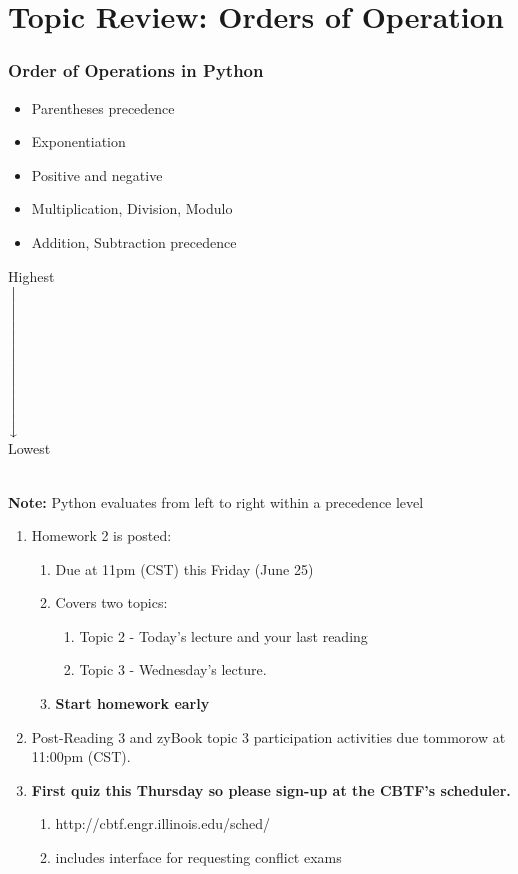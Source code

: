 \documentclass{beamer}
\newcommand{\xdownarrow}[1]{%
  {\left\downarrow\vbox to #1{}\right.\kern-\nulldelimiterspace}
}
\begin{document}
\section{Topic Review: Orders of Operation}

\begin{frame}
  \frametitle{Order of Operations in Python}
  \centering
  \begin{minipage}{0.49\textwidth}
    \begin{itemize}
      \item Parentheses precedence
      \item Exponentiation
      \item Positive and negative
      \item Multiplication, Division, Modulo
      \item Addition, Subtraction precedence
    \end{itemize}
  \end{minipage}
  \begin{minipage}{0.2\textwidth}
    \centering
    Highest\\
    $\xdownarrow{2cm}$\\
    Lowest\\
  \end{minipage}
  \vfill\\
  \textbf{Note:} Python evaluates from left to right within a precedence level
\end{frame}



%
%
%
\begin{frame}
  \begin{enumerate}
    \item Homework 2 is posted:
      \begin{enumerate}
        \item Due at 11pm (CST) this Friday (June 25)
        \item Covers two topics:
          \begin{enumerate}
            \item Topic 2 - Today's lecture and your last reading
            \item Topic 3 - Wednesday's lecture. 
          \end{enumerate}
        \item \textbf{Start homework early}
      \end{enumerate}
    \item Post-Reading 3 and zyBook topic 3 participation activities due tommorow at 11:00pm (CST).
    \item \textbf{First quiz this Thursday so please sign-up at the CBTF's scheduler.}
      \begin{enumerate}
        \item http://cbtf.engr.illinois.edu/sched/
        \item includes interface for requesting conflict exams
      \end{enumerate}
  \end{enumerate}
\end{frame}
\end{document}
